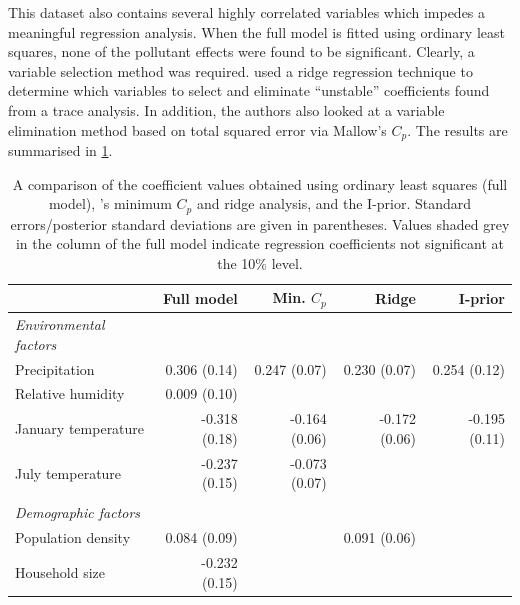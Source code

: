 \documentclass[a4paper,showframe,11pt]{report}
\begin{document}
This dataset also contains several highly correlated variables which impedes a meaningful regression analysis. 
When the full model is fitted using ordinary least squares, none of the pollutant effects were found to be significant. 
Clearly, a variable selection method was required. 
\citeauthor{McDonald1973} used a ridge regression technique to determine which variables to select and eliminate ``unstable'' coefficients found from a trace analysis. 
In addition, the authors also looked at a variable elimination method based on total squared error via Mallow's $C_p$.
The results are summarised in \cref{tab:poll}.

\begin{table}[htbp]
\centering
\caption[Results for the mortality and air pollution BVS model.]{A comparison of the coefficient values obtained using ordinary least squares (full model), \citeauthor{McDonald1973}'s minimum $C_p$ and ridge analysis, and the I-prior. Standard errors/posterior standard deviations are given in parentheses. Values shaded grey in the column of the full model indicate regression coefficients not significant at the 10\% level.}
\label{tab:poll}
\begin{tabular}{lrrrr}
\toprule
& Full model & Min. $C_p$ & Ridge  & I-prior \\ \midrule
\emph{Environmental factors} \\
\hspace{0.5em} Precipitation            & 0.306 (0.14)                 & 0.247 (0.07)   & 0.230 (0.07)      & 0.254 (0.12)       \\
\hspace{0.5em} Relative humidity        & {\color{gray} 0.009 (0.10)}  &                &                   &         \\
\hspace{0.5em} January temperature      & {\color{gray} -0.318 (0.18)} & -0.164 (0.06)  & -0.172 (0.06)     & -0.195 (0.11)        \\
\hspace{0.5em} July temperature         & {\color{gray} -0.237 (0.15)} & -0.073 (0.07)  &                   &         \\
\\
\emph{Demographic factors} \\
\hspace{0.5em} Population density       & {\color{gray} 0.084 (0.09)}  &                & 0.091 (0.06)      &         \\
\hspace{0.5em} Household size & {\color{gray} -0.232 (0.15)} &                &                   &         \\

\end{tabular}
\end{table}
\end{document}
